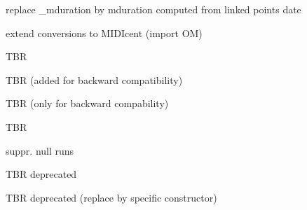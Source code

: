 \begin{DoxyRefList}
replace \+\_\+mduration by mduration computed from linked point\textquotesingle{}s date  
\item[Class \mbox{\hyperlink{classPitch}{Pitch}} ]\label{todo__todo000027}%
%
extend conversions to M\+I\+D\+Icent (import OM)  
\item[Member \mbox{\hyperlink{classPoint_a5508dcf134387f3f2271e95b578f3e3a}{Point::\+\_\+onoff}} ]\label{todo__todo000030}%
%
T\+BR  
\item[Member \mbox{\hyperlink{classPoint_a706ce56822f7e26dc66d67ce225d8a94}{Point::\+\_\+rduration}} ]\label{todo__todo000029}%
%
T\+BR (added for backward compatibility)  
\item[Member \mbox{\hyperlink{classPoint_a21ee97f153dd1c435f7d2e554887294f}{Point::rduration}} () const]\label{todo__todo000028}%
%
T\+BR (only for backward compability)  
\item[Member \mbox{\hyperlink{group__schemata_gabc0c5bcc094646426f0a90313808907b}{Pre\+State::Pre\+State}} (const \mbox{\hyperlink{classPreState}{Pre\+State}} \&)]\label{todo__todo000016}%
%
T\+BR  
\item[Class \mbox{\hyperlink{classRun}{Run$<$ P $>$}} ]\label{todo__todo000035}%
%
suppr. null runs  
\item[Member \mbox{\hyperlink{group__table_gab217454122f2ec0af5c16bb1ae996925}{S\+K\+I\+Ppointer::S\+K\+I\+Ppointer}} (\mbox{\hyperlink{classEnvironment}{Environment}} $\ast$env, pre\+\_\+t pre=0, pre\+\_\+t post=0, bool bar=false, size\+\_\+t k=1)]\label{todo__todo000034}%
%
T\+BR deprecated  
\item[Member \mbox{\hyperlink{group__table_ga022b6998c4273e2da8128ccd2205a7f6}{S\+Kpointer::S\+Kpointer}} (\mbox{\hyperlink{classWTA}{W\+TA}} $\ast$a, \mbox{\hyperlink{classEnvironment}{Environment}} $\ast$env, pre\+\_\+t pre=0, pre\+\_\+t post=0, \mbox{\hyperlink{classRational}{Rational}} mlen=\mbox{\hyperlink{classRational}{Rational(1)}}, size\+\_\+t k=1)]\label{todo__todo000033}%
%
T\+BR deprecated (replace by specific constructor)  
\item[Member \mbox{\hyperlink{group__table_ga49f82b7aafd3ae237243c85272597fa7}{Spointer::Spointer}} (\mbox{\hyperlink{classWTA}{W\+TA}} $\ast$a, \mbox{\hyperlink{classEnvironment}{Environment}} $\ast$env, pre\+\_\+t pre=0, pre\+\_\+t post=0, \mbox{\hyperlink{classRational}{Rational}} mlen=\mbox{\hyperlink{classRational}{Rational(1)}}, size\+\_\+t k=1)]\label{todo__todo000032}%

\end{DoxyRefList}
